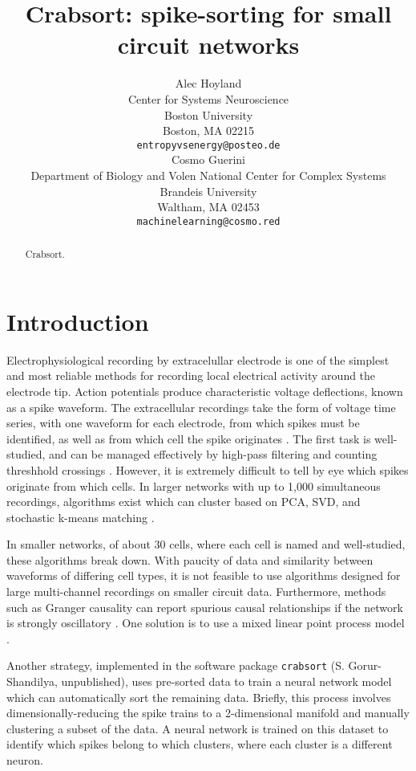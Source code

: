 \documentclass{article}
\title{Crabsort: spike-sorting for small circuit networks}
\author{%
  Alec Hoyland \\
  Center for Systems Neuroscience \\
  Boston University \\
  Boston, MA 02215 \\
  \texttt{entropyvsenergy@posteo.de} \\
  \And
  Cosmo Guerini \\
  Department of Biology and Volen National Center for Complex Systems \\
  Brandeis University \\
  Waltham, MA 02453 \\
  \texttt{machinelearning@cosmo.red}
}
\begin{document}
\maketitle

\begin{abstract}
  Crabsort.
\end{abstract}

\section{Introduction}

Electrophysiological recording by extracelullar electrode is one of the simplest and most reliable
methods for recording local electrical activity around the electrode tip.
Action potentials produce characteristic voltage deflections, known as a spike waveform.
The extracellular recordings take the form of voltage time series, with one waveform for each electrode,
from which spikes must be identified, as well as from which cell the spike originates \autocite{quirogaSpikeSorting2012}.
The first task is well-studied, and can be managed effectively by high-pass filtering and counting threshhold crossings \autocite{rossantSpikeSortingLarge2016, quirogaSpikeSorting2012}.
However, it is extremely difficult to tell by eye which spikes originate from which cells.
In larger networks with up to 1,000 simultaneous recordings, algorithms exist which can cluster
based on PCA, SVD, and stochastic k-means matching \autocite{pachitariuKilosortRealtimeSpikesorting2016, rossantSpikeSortingLarge2016}.

In smaller networks, of about 30 cells, where each cell is named and well-studied,
these algorithms break down. With paucity of data and similarity between waveforms of differing cell types,
it is not feasible to use algorithms designed for large multi-channel recordings on smaller circuit data.
Furthermore, methods such as Granger causality can report spurious causal relationships
if the network is strongly oscillatory \autocite{kisperskyFunctionalConnectivityRhythmic2011}.
One solution is to use a mixed linear point process model \autocite{gerhardSuccessfulReconstructionPhysiological2013a}.

Another strategy, implemented in the software package \texttt{crabsort} (S. Gorur-Shandilya, unpublished),
uses pre-sorted data to train a neural network model which can automatically sort the remaining data.
Briefly, this process involves dimensionally-reducing the spike trains to a 2-dimensional manifold
and manually clustering a subset of the data.
A neural network is trained on this dataset to identify which spikes belong to which clusters,
where each cluster is a different neuron.
\end{document}
